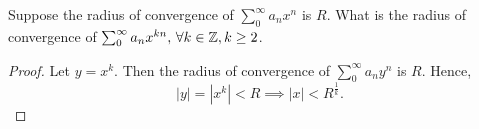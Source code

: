 \documentclass[../hw3]{subfiles}
\begin{document}
\begin{problem}
Suppose the radius of convergence of $\sum_{0}^{\infty} a_n x^n$ is $R$.
What is the radius of convergence of $\sum_{0}^{\infty} a_n x^{kn},\, \forall k\in \mathbb{Z}, k\ge 2$.
\end{problem}
\begin{proof}
	Let $y=x^k$.
	Then the radius of convergence of $\sum_{0}^{\infty} a_n y^n$ is $R$.
	Hence,  \[
		|y| = |x^k| < R \implies |x| < R^{\frac{1}{k}}
		.\]
\end{proof}
\end{document}
